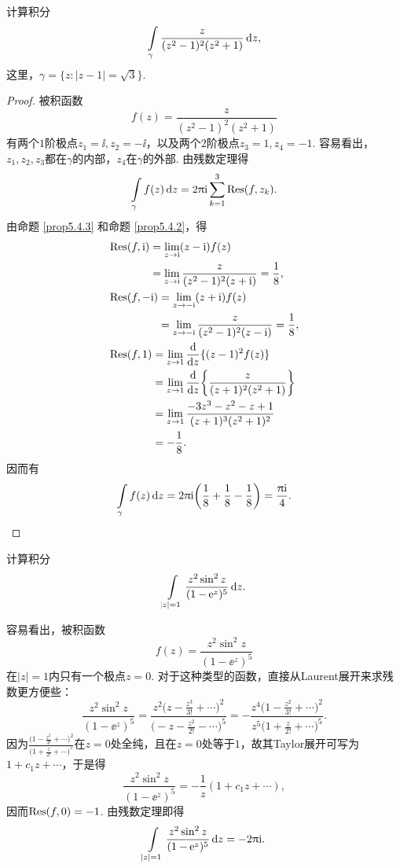 \begin{example}\label{exam5.4.10}
计算积分
\[\int\limits_{\gamma}\frac{z}{(z^2-1)^2(z^2+1)}\mathop{}\!\mathrm dz,\]
这里，$\gamma=\{z:|z-1|=\sqrt3\}$.
\end{example}
\begin{proof}被积函数
\[f(z)=\frac{z}{(z^2-1)^2(z^2+1)}\]
有两个$1$阶极点$z_1=\ii,z_2=-\ii$，以及两个$2$阶极点$z_3=1,z_4=-1$. 容易看出，$z_1,z_2,z_3$都在$\gamma$的内部，$z_4$在$\gamma$的外部. 由残数定理得
\[\int\limits_\gamma f(z)\mathop{}\!\mathrm dz=2\uppi\mathrm i\sum_{k=1}^3\operatorname*{Res}(f,z_k).\]
由命题 \ref{prop5.4.3} 和命题 \ref{prop5.4.2}，得
\begin{align*}
&\begin{aligned}
\operatorname*{Res}(f,\mathrm i)&=\lim_{z\to\mathrm i}(z-\mathrm i)f(z)\\
&=\lim_{z\to\mathrm i}\frac{z}{(z^2-1)^2(z+\mathrm i)}=\frac18,
\end{aligned}\\
&\begin{aligned}
\operatorname*{Res}(f,-\mathrm i)&=\lim_{z\to-\mathrm i}(z+\mathrm i)f(z)\\
&=\lim_{z\to-\mathrm i}\frac{z}{(z^2-1)^2(z-\mathrm i)}=\frac18,
\end{aligned}\\
&\begin{aligned}
\operatorname*{Res}(f,1)&=\lim_{z\to1}\frac{\mathop{}\!\mathrm d}{\mathop{}\!\mathrm dz}\{(z-1)^2f(z)\}\\
&=\lim_{z\to1}\frac{\mathop{}\!\mathrm d}{\mathop{}\!\mathrm dz}\bigg\{\frac z{(z+1)^2(z^2+1)}\bigg\}\\
&=\lim_{z\to1}\frac{-3z^3-z^2-z+1}{(z+1)^3(z^2+1)^2}\\
&=-\frac18.
\end{aligned}
\end{align*}
因而有
\[\int\limits_\gamma f(z)\mathop{}\!\mathrm dz=2\uppi\mathrm i\bigg(\frac18+\frac18-\frac18\bigg)
=\frac{\uppi\mathrm i}4.\]
\end{proof}

\begin{example}\label{exam5.4.11}
计算积分
\[\int\limits_{|z|=1}\frac{z^2\sin^2z}{(1-\operatorname{\!\!\;\mathrm e}^z)^5}\mathop{}\!\mathrm dz.\]
\end{example}
\begin{solution}
容易看出，被积函数
\[f(z)=\frac{z^2\sin^2z}{(1-\ee^z)^5}\]
在$|z|=1$内只有一个极点$z=0$. 对于这种类型的函数，直接从Laurent展开来求残数更方便些：
\[\frac{z^2\sin^2z}{(1-\ee^z)^5}
=\frac{z^2\big(z-\frac{z^3}{3!}+\cdots\big)^2}{\big(-z-\frac{z^2}{2!}-\cdots\big)^5}
=-\frac{z^4\big(1-\frac{z^2}{3!}+\cdots\big)^2}{z^5\big(1+\frac z{2!}+\cdots\big)^5}.\]
因为$\frac{\big(1-\frac{z^2}{3!}+\cdots\big)^2}{\big(1+\frac z{2!}+\cdots\big)^5}$在$z=0$处全纯，且在$z=0$处等于$1$，故其Taylor展开可写为$1+c_1z+\cdots$，于是得
\[\frac{z^2\sin^2z}{(1-\ee^z)^5}=-\frac1z(1+c_1z+\cdots),\]
因而$\operatorname*{Res}(f,0)=-1$. 由残数定理即得
\begin{equation*}
\int\limits_{|z|=1}\frac{z^2\sin^2z}{(1-\operatorname{\!\!\;\mathrm e}^z)^5}\mathop{}\!\mathrm dz=-2\uppi\mathrm i.
\end{equation*}
\end{solution}

